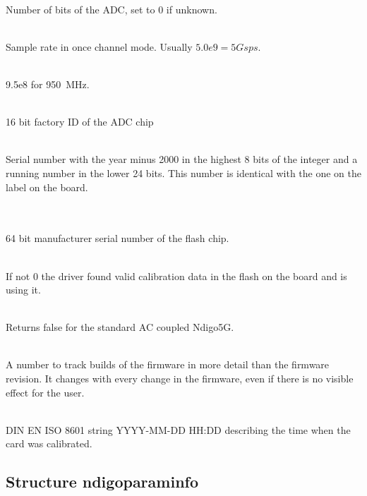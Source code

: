 			\\
			Number of bits of the ADC, set to 0 if unknown.\par

			\\
			Sample rate in once channel mode. Usually $5.0e9 = 5 Gsps$.\par

			\\
			9.5e8 for \SI{950}{\MHz}.
			
			\\
			16 bit factory ID of the ADC chip\par
			
			\\
			Serial number with the year minus 2000 in the highest 8 bits of the integer and a running number in the lower 24 bits. This number is identical with the one on the label on the board.\par

			\\
			\\
			64 bit manufacturer serial number of the flash chip.\par

			\\
			If not 0 the driver found valid calibration data in the flash on the board and is using it.\par

			\\
			Returns false for the standard AC coupled Ndigo5G.\par

			\\
			A number to track builds of the firmware in more detail than the firmware revision. It changes with every change in the firmware, even if there is no visible effect for the user.\par
			
			\\
			DIN EN ISO 8601 string YYYY-MM-DD HH:DD describing the time when the card was calibrated.
		
		\subsection{Structure ndigo\tu param\tu info}
		
